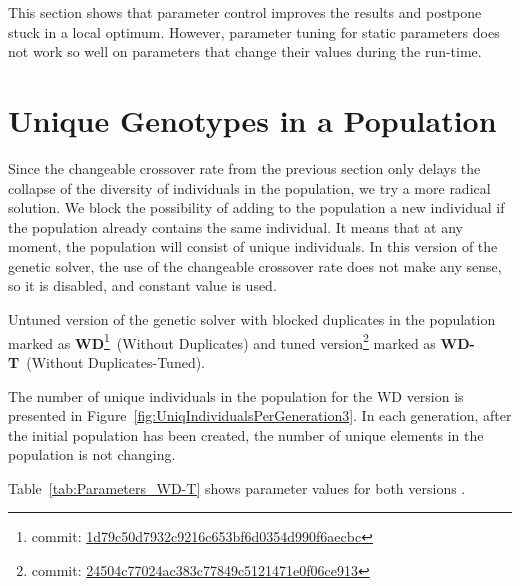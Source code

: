 This section shows that parameter control improves the results and postpone stuck in a local optimum. However, parameter tuning for static parameters does not work so well on parameters that change their values during the run-time.                     

\section{Unique Genotypes in a Population}
\label{sec:WD}

Since the changeable crossover rate from the previous section only delays the collapse of the diversity of individuals in the population, we try a more radical solution. We block the possibility of adding to the population a new individual if the population already contains the same individual. It means that at any moment, the population will consist of unique individuals. In this version of the genetic solver, the use of the changeable crossover rate does not make any sense, so it is disabled, and constant value is used.

Untuned version of the genetic solver with blocked duplicates in the population marked as \textbf{WD}\footnote{commit: \href{https://git-st.inf.tu-dresden.de/mquat/mquat2/commit/1d79c50d7932c9216c653bf6d0354d990f6aecbc}{1d79c50d7932c9216c653bf6d0354d990f6aecbc}}~(Without Duplicates) and tuned version\footnote{commit: \href{https://git-st.inf.tu-dresden.de/mquat/mquat2/commit/24504c77024ac383c77849c5121471e0f06ce913}{24504c77024ac383c77849c5121471e0f06ce913}} marked as \textbf{WD-T}~(Without Duplicates-Tuned).

The number of unique individuals in the population for the WD version is presented in Figure~\ref{fig:UniqIndividualsPerGeneration3}. In each generation, after the initial population has been created, the number of unique elements in the population is not changing.



Table~\ref{tab:Parameters_WD-T} shows parameter values for both versions .



